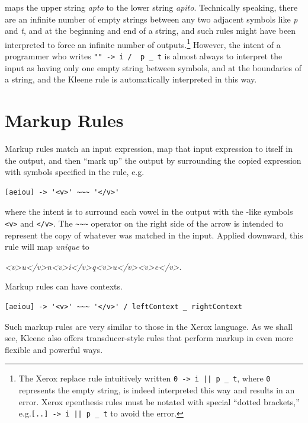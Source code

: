 \noindent
maps the upper string \emph{apto} to the lower string \emph{apito}.  Technically speaking, there are an infinite number
of empty strings between any two adjacent symbols like \emph{p} and \emph{t}, and at the beginning and end of a string, and such rules might have been interpreted to force
an infinite number of outputs.\footnote{The Xerox replace rule intuitively
	written \verb!0 -> i || p _ t!, where \verb!0! represents the empty
	string, is indeed interpreted this
way and results in an error.  Xerox epenthesis rules must be notated with special ``dotted brackets,'' 
e.g.\@ \verb![..] -> i || p _ t! to avoid the error.}  However, the intent of a programmer who writes \verb!"" -> i /  p _ t! is almost always to
interpret the input as having only one empty string between symbols, and at the boundaries of a string, and the Kleene rule is automatically interpreted in this way.


\section{Markup Rules}

\label{markupRules}

Markup rules match an input expression, map that input expression to itself in the output, and then ``mark up'' the
output by surrounding the copied expression with symbols specified in the rule, e.g.

\begin{Verbatim}
[aeiou] -> '<v>' ~~~ '</v>'
\end{Verbatim}

\noindent
where the intent is to surround each vowel in the output with the
-like symbols \verb!<v>! and \verb!</v>!.  The \verb!~~~!
operator on the right side of the arrow is intended to represent the copy
of whatever was matched in the input.  Applied downward,
this rule will map \emph{unique} to 

\noindent
\emph{<v>u</v>n<v>i</v>q<v>u</v><v>e</v>}.

Markup rules can have contexts.

\begin{Verbatim}
[aeiou] -> '<v>' ~~~ '</v>' / leftContext _ rightContext
\end{Verbatim}

Such markup rules are very similar to those in the Xerox \xfst{} language.  As we shall see, Kleene also offers transducer-style rules that perform
markup in even more flexible and powerful ways.

